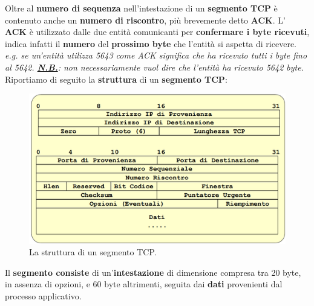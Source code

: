 \documentclass[11pt,a4paper,oneside]{book}
\theoremstyle{definition}
\begin{document}
Oltre al \textbf{numero di sequenza } nell'intestazione di un \textbf{segmento TCP} è contenuto anche un \textbf{numero di riscontro}, più brevemente detto \textbf{ACK}. L' \textbf{ACK} è utilizzato dalle due entità comunicanti per \textbf{confermare i byte ricevuti}, indica infatti il \textbf{numero} del \textbf{prossimo byte }che l'entità si aspetta di ricevere.\textit{ e.g. se un'entità utilizza 5643 come ACK significa che ha ricevuto tutti i byte fino al 5642. \underline{\textbf{N.B.}}: non necessariamente vuol dire che l'entità ha ricevuto 5642 byte.}\newline
Riportiamo di seguito la \textbf{struttura} di un \textbf{segmento TCP}:
\begin{figure}[!h]
	\includegraphics[scale=0.5]{Immagini/TCP_segment.png}
	\centering
	\caption{La struttura di un segmento TCP.}
\end{figure}\newline
Il \textbf{segmento consiste} di un'\textbf{intestazione} di dimensione compresa tra 20 byte, in assenza di opzioni, e 60 byte altrimenti, seguita dai \textbf{dati} provenienti dal processo applicativo.
\end{document}
